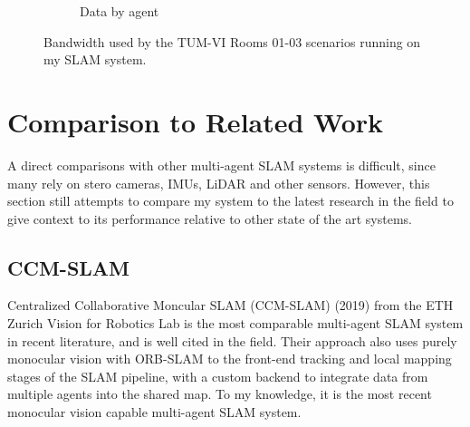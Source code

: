 \begin{figure}[h]
\begin{subfigure}[b]{0.45\linewidth}
        \caption{Data by agent}
    \end{subfigure}%

    \caption{Bandwidth used by the TUM-VI Rooms 01-03 scenarios running on my SLAM system.}
    \label{fig:tum-rooms-01-03-bandwith}
\end{figure}


\section{Comparison to Related Work}
\label{sec:comparison-to-related-work}

A direct comparisons with other multi-agent SLAM systems is difficult, since many rely on stero cameras, IMUs, LiDAR and other sensors. However, this section still attempts to compare my system to the latest research in the field to give context to its performance relative to other state of the art systems.

\subsection{CCM-SLAM}
\label{sec:ccm-slam}
Centralized Collaborative Moncular SLAM (CCM-SLAM) (2019) from the ETH Zurich Vision for Robotics Lab \autocite{schmuck2019ccm} is the most comparable multi-agent SLAM system in recent literature, and is well cited in the field. Their approach also uses purely monocular vision with ORB-SLAM to the front-end tracking and local mapping stages of the SLAM pipeline, with a custom backend to integrate data from multiple agents into the shared map. To my knowledge, it is the most recent monocular vision capable multi-agent SLAM system.

